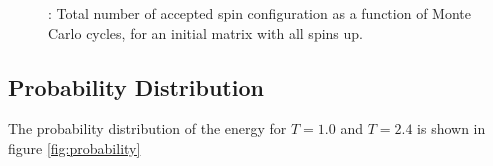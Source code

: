 \documentclass{article}
\begin{document}
{{		\begin{figure}[H]
		\caption{: Total number of accepted spin configuration as a function of Monte Carlo cycles, for an initial matrix with all spins up. }
		\label{fig:flips_random}
		\end{figure}
\newpage
	\subsection{Probability Distribution}
		The probability distribution of the energy for $T = 1.0$ and $T = 2.4$ is shown in figure \ref{fig:probability}

}}
\end{document}
